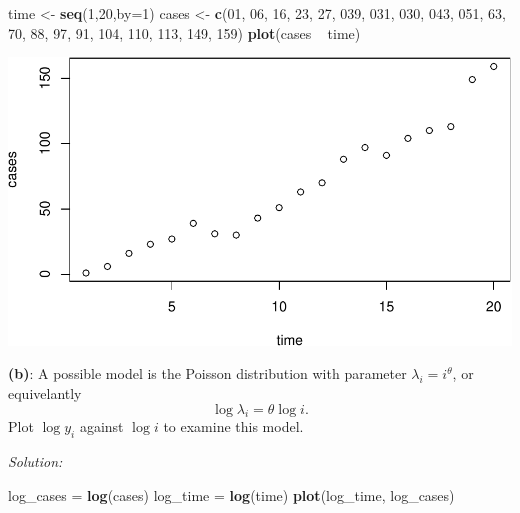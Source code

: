 \documentclass[]{article}
\newenvironment{Shaded}{\begin{snugshade}}{\end{snugshade}}
\newcommand{\KeywordTok}[1]{\textcolor[rgb]{0.13,0.29,0.53}{\textbf{{#1}}}}
\newcommand{\DataTypeTok}[1]{\textcolor[rgb]{0.13,0.29,0.53}{{#1}}}
\newcommand{\DecValTok}[1]{\textcolor[rgb]{0.00,0.00,0.81}{{#1}}}
\newcommand{\StringTok}[1]{\textcolor[rgb]{0.31,0.60,0.02}{{#1}}}
\newcommand{\NormalTok}[1]{{#1}}
\begin{document}
\begin{Shaded}
\begin{Highlighting}[]
\NormalTok{time <-}\StringTok{ }\KeywordTok{seq}\NormalTok{(}\DecValTok{1}\NormalTok{,}\DecValTok{20}\NormalTok{,}\DataTypeTok{by=}\DecValTok{1}\NormalTok{)}
\NormalTok{cases <-}\StringTok{ }\KeywordTok{c}\NormalTok{(}\DecValTok{01}\NormalTok{, }\DecValTok{06}\NormalTok{, }\DecValTok{16}\NormalTok{, }\DecValTok{23}\NormalTok{, }\DecValTok{27}\NormalTok{, }\DecValTok{039}\NormalTok{, }\DecValTok{031}\NormalTok{, }\DecValTok{030}\NormalTok{, }\DecValTok{043}\NormalTok{, }\DecValTok{051}\NormalTok{,}
          \DecValTok{63}\NormalTok{, }\DecValTok{70}\NormalTok{, }\DecValTok{88}\NormalTok{, }\DecValTok{97}\NormalTok{, }\DecValTok{91}\NormalTok{, }\DecValTok{104}\NormalTok{, }\DecValTok{110}\NormalTok{, }\DecValTok{113}\NormalTok{, }\DecValTok{149}\NormalTok{, }\DecValTok{159}\NormalTok{)}
\KeywordTok{plot}\NormalTok{(cases ~}\StringTok{ }\NormalTok{time)}
\end{Highlighting}
\end{Shaded}

\includegraphics{ExercisesWithSolutions_files/figure-latex/unnamed-chunk-1-1.pdf}

\textbf{(b)}: A possible model is the Poisson distribution with
parameter \(\lambda_i = i^\theta\), or equivelantly \[
\log\lambda_i = \theta\log i.
\] Plot \(\log y_i\) against \(\log i\) to examine this model.

\emph{Solution: }

\begin{Shaded}
\begin{Highlighting}[]
\NormalTok{log_cases =}\StringTok{ }\KeywordTok{log}\NormalTok{(cases)}
\NormalTok{log_time =}\StringTok{ }\KeywordTok{log}\NormalTok{(time)}
\KeywordTok{plot}\NormalTok{(log_time, log_cases)}
\end{Highlighting}
\end{Shaded}
\end{document}
